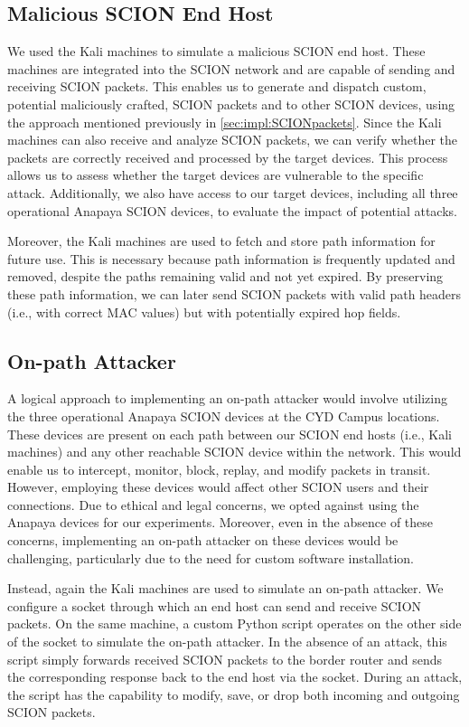 \subsection{Malicious SCION End Host}
We used the Kali machines to simulate a malicious SCION end host.
These machines are integrated into the SCION network and are capable of sending and receiving SCION packets.
This enables us to generate and dispatch custom, potential maliciously crafted, SCION packets and to other SCION devices, using the approach mentioned previously in \cref{sec:impl:SCIONpackets}.
Since the Kali machines can also receive and analyze SCION packets, we can verify whether the packets are correctly received and processed by the target devices.
This process allows us to assess whether the target devices are vulnerable to the specific attack.
Additionally, we also have access to our target devices, including all three operational Anapaya SCION devices, to evaluate the impact of potential attacks.

Moreover, the Kali machines are used to fetch and store path information for future use.
This is necessary because path information is frequently updated and removed, despite the paths remaining valid and not yet expired.
By preserving these path information, we can later send SCION packets with valid path headers (i.e., with correct MAC values) but with potentially expired hop fields.


\subsection{On-path Attacker}
A logical approach to implementing an on-path attacker would involve utilizing the three operational Anapaya SCION devices at the CYD Campus locations.
These devices are present on each path between our SCION end hosts (i.e., Kali machines) and any other reachable SCION device within the network.
This would enable us to intercept, monitor, block, replay, and modify packets in transit.
However, employing these devices would affect other SCION users and their connections.
Due to ethical and legal concerns, we opted against using the Anapaya devices for our experiments.
Moreover, even in the absence of these concerns, implementing an on-path attacker on these devices would be challenging, particularly due to the need for custom software installation.

Instead, again the Kali machines are used to simulate an on-path attacker.
We configure a socket through which an end host can send and receive SCION packets.
On the same machine, a custom Python script operates on the other side of the socket to simulate the on-path attacker.
In the absence of an attack, this script simply forwards received SCION packets to the border router and sends the corresponding response back to the end host via the socket.
During an attack, the script has the capability to modify, save, or drop both incoming and outgoing SCION packets.


